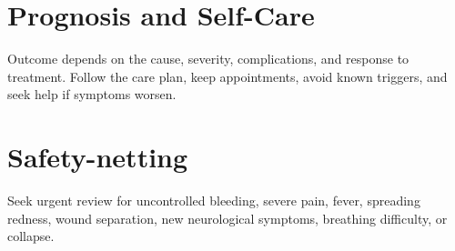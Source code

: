 \section*{Prognosis and Self-Care}
Outcome depends on the cause, severity, complications, and response to treatment. Follow the care plan, keep appointments, avoid known triggers, and seek help if symptoms worsen.
\section*{Safety-netting}
Seek urgent review for uncontrolled bleeding, severe pain, fever, spreading redness, wound separation, new neurological symptoms, breathing difficulty, or collapse.
